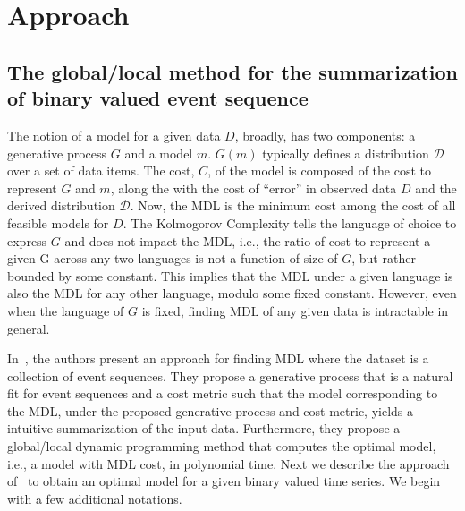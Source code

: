 
\section{Approach}


\subsection{The global/local method for the summarization of  binary valued event sequence}
The notion of a model for a given data $D$, broadly, has two components: a generative process $G$ and a model $m$.
$G(m)$ typically defines a distribution $\mathcal D$ over a set of data items. The cost, $C$,  of the model is composed of
the cost to represent $G$ and $m$, along the with the cost of ``error'' in observed data $D$ and
the derived distribution $\mathcal D$. Now, the MDL is the minimum cost
among the cost of all feasible models for $D$. 
The Kolmogorov Complexity tells the language of choice to express $G$ and does not impact the MDL, i.e.,
the ratio of cost to represent a given G across any  two languages is not a function of size of  $G$,
but rather bounded by some constant. This implies that the MDL under a given language is also
the MDL for any other language, modulo some fixed constant. However,
even when the language of $G$ is fixed, finding MDL of any given data is intractable in general. 

In~\cite{Kiernan:constructing}, the authors present an approach for finding MDL where the dataset
is a collection of event sequences. They propose a generative process that is a natural fit for
event sequences and a cost metric such that the model corresponding to the MDL, under 
the proposed generative process and cost metric, yields a intuitive summarization of the input data.
Furthermore, they propose a global/local dynamic programming method that computes the optimal model, i.e.,
a model with MDL cost, in polynomial time.
Next we describe the approach of~\cite{Kiernan:constructing} to obtain an optimal model for a given binary valued time series.
We begin with a few additional notations.

